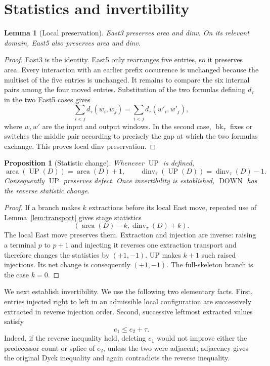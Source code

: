 \documentclass[11pt]{article}
\newtheorem{lemma}[theorem]{Lemma}
\newtheorem{proposition}[theorem]{Proposition}
\theoremstyle{definition}
\theoremstyle{remark}
\newcommand{\area}{\operatorname{area}}
\newcommand{\dinv}{\operatorname{dinv}}
\newcommand{\UP}{\operatorname{UP}}
\newcommand{\DOWN}{\operatorname{DOWN}}
\newcommand{\bk}{\operatorname{bk}}
\begin{document}
\section{Statistics and invertibility}

\begin{lemma}[Local preservation]
\label{lem:local-preservation}
East3 preserves area and dinv.  On its relevant domain, East5 also preserves
area and dinv.
\end{lemma}

\begin{proof}
East3 is the identity.  East5 only rearranges five entries, so it preserves
area.  Every interaction with an earlier prefix occurrence is unchanged
because the multiset of the five entries is unchanged.  It remains to compare
the six internal pairs among the four moved entries.  Substitution of the
two formulas defining $d_\tau$ in the two East5 cases gives
\[
  \sum_{i<j}d_\tau(w_i,w_j)
  =\sum_{i<j}d_\tau(w'_i,w'_j),
\]
where $w,w'$ are the input and output windows.  In the second case,
$\bk_\tau$ fixes or switches the middle pair according to precisely the gap
at which the two formulas exchange.  This proves local dinv preservation.
\end{proof}

\begin{proposition}[Statistic change]
\label{prop:statistics}
Whenever $\UP$ is defined,
\[
 \area(\UP(D))=\area(D)+1,
 \qquad
 \dinv_\tau(\UP(D))=\dinv_\tau(D)-1.
\]
Consequently $\UP$ preserves defect.  Once invertibility is established,
$\DOWN$ has the reverse statistic change.
\end{proposition}

\begin{proof}
If a branch makes $k$ extractions before its local East move, repeated use of
Lemma~\ref{lem:transport} gives stage statistics
\[
  (\area(D)-k,\dinv_\tau(D)+k).
\]
The local East move preserves them.  Extraction and injection are inverse:
raising a terminal $p$ to $p+1$ and injecting it reverses one extraction
transport and therefore changes the statistics by $(+1,-1)$.  UP makes
$k+1$ such raised injections.  Its net change is consequently $(+1,-1)$.
The full-skeleton branch is the case $k=0$.
\end{proof}

We next establish invertibility.  We use the following two elementary facts.
First, entries injected right to left in an admissible local configuration
are successively extracted in reverse injection order.  Second, successive
leftmost extracted values satisfy
\begin{equation}
  e_1\le e_2+\tau.
  \label{eq:successive-extraction}
\end{equation}
Indeed, if the reverse inequality held, deleting $e_1$ would not improve
either the predecessor count or splice of $e_2$, unless the two were
adjacent; adjacency gives the original Dyck inequality and again contradicts
the reverse inequality.
\end{document}
